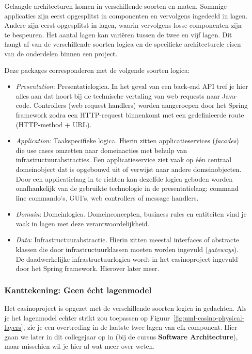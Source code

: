 \documentclass[dutch,a4paper,12pt,doubleside]{book}
\begin{document}
Gelaagde architecturen komen in verschillende soorten en maten. Sommige applicaties 
zijn eerst opgesplitst in componenten en vervolgens ingedeeld in lagen. Andere zijn 
eerst opgesplitst in lagen, waarin vervolgens losse componenten zijn te bespeuren.
Het aantal lagen kan variëren tussen de twee en vijf lagen. Dit hangt af 
van de verschillende soorten logica en de specifieke architecturele eisen
van de onderdelen binnen een project.

Deze packages corresponderen met de volgende soorten logica:
\begin{itemize}
    \item \emph{Presentation}: Presentatielogica. In het geval van een back-end API tref
    je hier alles aan dat hoort bij de technische vertaling van web requests naar Java-code. 
    Controllers (web request handlers) worden aangeroepen door het Spring framework 
    zodra een HTTP-request binnenkomt met een gedefinieerde route (HTTP-method + URL).
    \item \emph{Application}: Taakspecifieke logica. Hierin zitten applicatieservices (\emph{facades}) 
    die use cases omzetten naar domeinacties met behulp van infrastructuurabstracties. Een applicatieservice
    ziet vaak op één centraal domeinobject dat is opgebouwd uit of verwijst naar andere domeinobjecten.
    Door een applicatielaag in te richten kan dezelfde logica geboden worden onafhankelijk van de gebruikte 
    technologie in de presentatielaag: command line commando's, GUI's, web controllers of message handlers.
    \item \emph{Domain}: Domeinlogica. Domeinconcepten, business rules en entiteiten vind je vaak in lagen 
    met deze verantwoordelijkheid.
    \item \emph{Data}: Infrastructuurabstractie. Hierin zitten meestal interfaces of abstracte klassen die door
    infrastructuurklassen moeten worden ingevuld (\emph{gateways}). De daadwerkelijke infrastructuurlogica 
    wordt in het casinoproject ingevuld door het Spring framework. Hierover later meer.
\end{itemize}

\subsubsection{Kanttekening: Geen écht lagenmodel}
Het casinoproject is opgezet met de verschillende soorten logica in gedachten. 
Als je het lagenmodel echter strikt zou toepassen op Figuur~\ref{fig:uml-casino-physical-layers}, 
zie je een overtreding in de laatste twee lagen van elk component. 
Hier gaan we later in dit collegejaar op in (bij de cursus \textbf{Software Architecture}),
maar misschien wil je hier al wat meer over weten.
\end{document}
